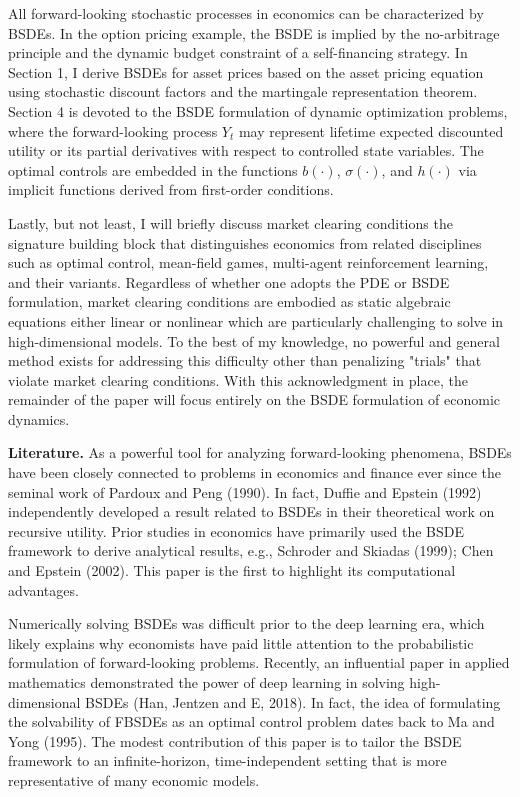 \documentclass{article}
\begin{document}
\clearpage

All forward-looking stochastic processes in economics can be characterized by BSDEs. In the option pricing example, the BSDE is implied by the no-arbitrage principle and the dynamic budget constraint of a self-financing strategy. In Section 1, I derive BSDEs for asset prices based on the asset pricing equation using stochastic discount factors and the martingale representation theorem. Section 4 is devoted to the BSDE formulation of dynamic optimization problems, where the forward-looking process $Y_{t}$ may represent lifetime expected discounted utility or its partial derivatives with respect to controlled state variables. The optimal controls are embedded in the functions $b(\cdot)$, $\sigma(\cdot)$, and $h(\cdot)$ via implicit functions derived from first-order conditions.

Lastly, but not least, I will briefly discuss market clearing conditions the signature building block that distinguishes economics from related disciplines such as optimal control, mean-field games, multi-agent reinforcement learning, and their variants. Regardless of whether one adopts the PDE or BSDE formulation, market clearing conditions are embodied as static algebraic equations either linear or nonlinear which are particularly challenging to solve in high-dimensional models. To the best of my knowledge, no powerful and general method exists for addressing this difficulty other than penalizing "trials" that violate market clearing conditions. With this acknowledgment in place, the remainder of the paper will focus entirely on the BSDE formulation of economic dynamics.

\textbf{Literature.} As a powerful tool for analyzing forward-looking phenomena, BSDEs have been closely connected to problems in economics and finance ever since the seminal work of Pardoux and Peng (1990). In fact, Duffie and Epstein (1992) independently developed a result related to BSDEs in their theoretical work on recursive utility. Prior studies in economics have primarily used the BSDE framework to derive analytical results, e.g., Schroder and Skiadas (1999); Chen and Epstein (2002). This paper is the first to highlight its computational advantages.

Numerically solving BSDEs was difficult prior to the deep learning era, which likely explains why economists have paid little attention to the probabilistic formulation of forward-looking problems. Recently, an influential paper in applied mathematics demonstrated the power of deep learning in solving high-dimensional BSDEs (Han, Jentzen and E, 2018). In fact, the idea of formulating the solvability of FBSDEs as an optimal control problem dates back to Ma and Yong (1995). The modest contribution of this paper is to tailor the BSDE framework to an infinite-horizon, time-independent setting that is more representative of many economic models.
\end{document}
